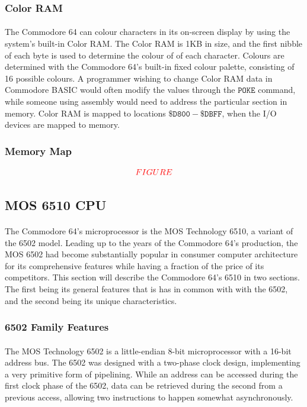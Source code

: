 \documentclass{article}
\begin{document}
\subsubsection{Color RAM}
\paragraph{}
The Commodore 64 can colour characters in its on-screen display by using the system's built-in Color RAM. The Color RAM is 1KB in size, and the first nibble of each byte is used to determine the colour of of each character. Colours are determined with the Commodore 64's built-in fixed colour palette, consisting of 16 possible colours. A programmer wishing to change Color RAM data in Commodore BASIC would often modify the values through the $\mathtt{POKE}$ command, while someone using assembly would need to address the particular section in memory. Color RAM is mapped to locations $\mathtt{\$D800 - \$DBFF}$, when the I/O devices are mapped to memory.

\subsubsection{Memory Map}
\[\textcolor{red}{FIGURE}\]

\subsection{MOS 6510 CPU}
\paragraph{}
The Commodore 64's microprocessor is the MOS Technology 6510, a variant of the 6502 model. Leading up to the years of the Commodore 64's production, the MOS 6502 had become substantially popular in consumer computer architecture for its comprehensive features while having a fraction of the price of its competitors. This section will describe the Commodore 64's 6510 in two sections. The first being its general features that is has in common with with the 6502, and the second being its unique characteristics.

\subsubsection{6502 Family Features}

\paragraph{}
The MOS Technology 6502 is a little-endian 8-bit microprocessor with a 16-bit address bus. The 6502 was designed with a two-phase clock design, implementing a very primitive form of pipelining. While an address can be accessed during the first clock phase of the 6502, data can be retrieved during the second from a previous access, allowing two instructions to happen somewhat asynchronously. 
\end{document}
